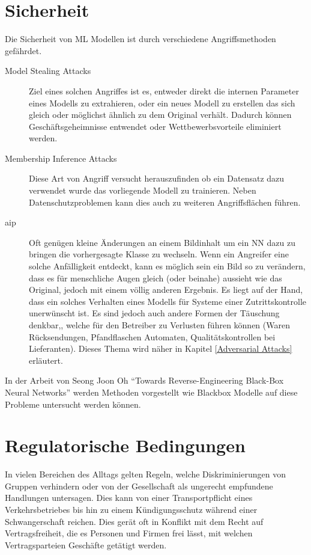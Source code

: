 \documentclass[
  12pt, %
  a4paper, %
  oneside, %
  openany, 
  numbers=noenddot, %
  BCOR=5mm, %
  parskip=half*, %
  thesis, %
]{bfhbook}
\begin{document}
\section{Sicherheit}
\label{Sicherheit}
Die Sicherheit von \Gls{ML} Modellen ist durch verschiedene Angriffsmethoden gefährdet.
\begin{description}
	\item[Model Stealing Attacks] Ziel eines solchen Angriffes ist es, entweder direkt die internen Parameter eines Modells zu extrahieren, oder ein neues Modell zu erstellen das sich gleich oder möglichst ähnlich zu dem Original verhält. Dadurch können Geschäftsgeheimnisse entwendet oder Wettbewerbsvorteile eliminiert werden.
	\item[Membership Inference Attacks] Diese Art von Angriff versucht herauszufinden ob ein Datensatz dazu verwendet wurde das vorliegende Modell zu trainieren. Neben Datenschutzproblemen kann dies auch zu weiteren Angriffsflächen führen.
	\item[\acrfull{aip}] Oft genügen kleine Änderungen an einem Bildinhalt um ein \gls{NN} dazu zu bringen die vorhergesagte Klasse zu wechseln. Wenn ein Angreifer eine solche Anfälligkeit entdeckt, kann es möglich sein ein Bild so zu verändern, dass es für menschliche Augen gleich (oder beinahe) aussieht wie das Original, jedoch mit einem völlig anderen Ergebnis. Es liegt auf der Hand, dass ein solches Verhalten eines Modells für Systeme einer Zutrittskontrolle unerwünscht ist. Es sind jedoch auch andere Formen der Täuschung denkbar,, welche für den Betreiber zu Verlusten führen können (Waren Rücksendungen, Pfandflaschen Automaten, Qualitätskontrollen bei Lieferanten). Dieses Thema wird näher in Kapitel \ref{Adversarial Attacks} erläutert.
\end{description}

In der Arbeit von Seong Joon Oh ``Towards Reverse-Engineering Black-Box Neural Networks'' \parencite{Oh2019} werden Methoden vorgestellt wie \Gls{Blackbox} Modelle auf diese Probleme untersucht werden können.

\section{Regulatorische Bedingungen}
In vielen Bereichen des Alltags gelten Regeln, welche Diskriminierungen von Gruppen verhindern oder von der Gesellschaft als ungerecht empfundene Handlungen untersagen. Dies kann von einer Transportpflicht eines Verkehrsbetriebes bis hin zu einem Kündigungsschutz während einer Schwangerschaft reichen. Dies gerät oft in Konflikt mit dem Recht auf Vertragsfreiheit, die es Personen und Firmen frei lässt, mit welchen Vertragsparteien Geschäfte getätigt werden.
\end{document}

